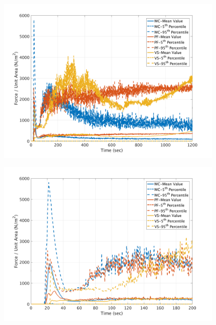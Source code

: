 \documentclass[a4paper,10pt]{article}
\begin{document}
\begin{figure}[H]
	\begin{minipage}[b]{0.5\linewidth}
	\centering
    \includegraphics[width=1\textwidth]{NetFAll/NetF4All.png}     
        \label{fig:NF4}
	\end{minipage}
	\begin{minipage}[b]{0.5\linewidth}
	\centering
    \includegraphics[width=1\textwidth]{NetFAll/NetF4All_z.png}
        \label{fig:NF4zoom}
	\end{minipage}
	

\end{figure}
\end{document}
